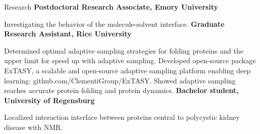 \begin{rubric}{Research}
%
	\textbf{Postdoctoral Research Associate, Emory University}
  \par Investigating the behavior of the molecule-solvent interface.
\entry*[2014 -- 2020]%
  \textbf{Graduate Research Assistant, Rice University}
  \par Determined optimal adaptive sampling strategies for folding proteins and the upper limit for speed up with adaptive sampling. Developed open-source package ExTASY, a scalable and open-source adaptive sampling platform enabling deep learning: github.com/ClementiGroup/ExTASY. Showed adaptive sampling reaches accurate protein folding and protein dynamics.
\entry*[2012]%
  \textbf{Bachelor student, University of Regensburg}
  \par Localized interaction interface between proteins central to polycystic kidney disease with NMR.
\end{rubric}
